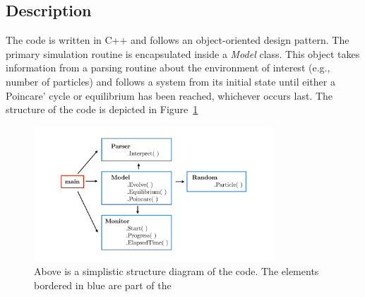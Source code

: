 	\vspace*{2\baselineskip}

	\begin{multicols}{2}[]
		
		\section{Description}

		The code is written in C++ and follows an object-oriented design pattern.
		The primary simulation routine is encapsulated inside a \textit{Model} 
		class. This object takes information from a parsing routine about the
		environment of interest (e.g., number of particles) and follows a system
		from its initial state until either a Poincare' cycle or equilibrium has
		been reached, whichever occurs last. The structure of the code is 
		depicted in Figure~\ref{fig:structure}

		\begin{figure}[t!]
			\captionsetup{width=0.8\textwidth}
			\centering
			\includegraphics[width=0.8\textwidth]{figures/Structure.pdf}
			\caption{Above is a simplistic structure diagram of the code.
			The elements bordered in blue are part of the}
			\label{fig:structure}
		\end{figure}


	\end{multicols}

	
	
